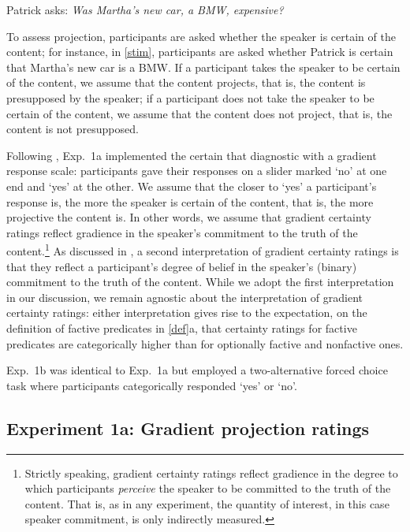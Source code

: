 \documentclass{language}
\newcommand{\6}{\mbox{$[\hspace*{-.6mm}[$}}
\newcommand{\9}{\mbox{$]\hspace*{-.6mm}]$}}
\begin{document}
\begin{exe}

\ex\label{stim} Patrick asks: {\em Was Martha's new car, a BMW, expensive?} 

\end{exe}
To assess projection, participants are asked whether the speaker is certain of the content; for instance, in \ref{stim}, participants are asked whether Patrick is certain that Martha's new car is a BMW. If a participant takes the speaker to be certain of the content, we assume that the content projects, that is, the content is presupposed by the speaker; if a participant does not take the speaker to be certain of the content, we assume that the content does not project, that is, the content is not presupposed.

Following \citealt{tbd-variability}, Exp.~1a implemented the certain that diagnostic with a gradient response scale: participants gave their responses on a slider marked `no' at one end and `yes' at the other. We assume that the closer to `yes' a participant's response is, the more the speaker is certain of the content, that is, the more projective the content is. In other words, we assume that gradient certainty ratings reflect gradience in the speaker's commitment to the truth of the content.\footnote{Strictly speaking,  gradient certainty ratings reflect gradience in the degree to which participants \emph{perceive} the speaker to be committed to the truth of the content. That is, as in any experiment, the quantity of interest, in this case speaker commitment, is only indirectly measured.} As discussed in \citealt{tbd-variability}, a second interpretation of gradient certainty ratings is that they reflect a participant's degree of belief in the speaker's (binary) commitment to the truth of the content. While we adopt the first interpretation in our discussion, we remain agnostic about the interpretation of gradient certainty ratings: either interpretation gives rise to the expectation,  on the definition of factive predicates in \ref{def}a, that certainty ratings for factive predicates are categorically higher than for optionally factive and nonfactive ones. 

Exp.~1b was identical to Exp.~1a but employed a two-alternative forced choice task where participants categorically responded `yes' or `no'.
 
\subsection{Experiment 1a: Gradient projection ratings}\label{s-exp1a}
\end{document}
